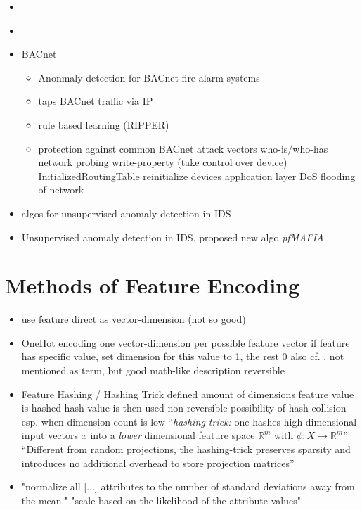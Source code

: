\begin{itemize}
	\item \parencite{Yang2006}
	\item \parencite{Celeda2012}
	\item \textcite{Pan2014} BACnet
		\begin{itemize}
			\item Anonmaly detection for BACnet fire alarm systems
			\item taps BACnet traffic via IP
			\item rule based learning (RIPPER)
			\item protection against common BACnet attack vectors
				\subitem who-is/who-has network probing
				\subitem write-property (take control over device)
				\subitem InitializedRoutingTable
				\subitem reinitialize devices
				\subitem application layer DoS
				\subitem flooding of network
		\end{itemize}
	
	\item \textcite{Eskin2002} algos for unsupervised anomaly detection in IDS
	\item \textcite{Leung2005} Unsupervised anomaly detection in IDS, proposed new algo \emph{pfMAFIA}
\end{itemize}

\section{Methods of Feature Encoding}
\label{sec:background:network:features}

\begin{itemize}
	\item use feature direct as vector-dimension (not so good)
	\item OneHot encoding
		\subitem one vector-dimension per possible feature vector
		\subitem if feature has specific value, set dimension for this value to 1, the rest 0
		\subitem also cf. \textcite[][p. 12]{Eskin2002}, not mentioned as term, but good math-like description
		\subitem reversible
	\item Feature Hashing / Hashing Trick
		\subitem defined amount of dimensions
		\subitem feature value is hashed
		\subitem hash value is then used
		\subitem non reversible
		\subitem possibility of hash collision
		\subitem esp. when dimension count is low
		\subitem \enquote{\emph{hashing-trick:} one hashes high dimensional input vectors $x$ into a \emph{lower} dimensional feature space $\mathbb{R}^m$ with $\phi: X \rightarrow \mathbb{R}^m$} \parencite{Weinberger2009,Shi2009,Langford2007}
		\subitem \enquote{Different from random projections, the hashing-trick preserves sparsity and introduces no additional overhead to store projection matrices} \parencite{Weinberger2009}
	\item "normalize all [...] attributes to the number of standard deviations away from the mean." \parencite{Eskin2002}
		\subitem "scale based on the likelihood of the attribute values" \parencite{Eskin2002}
		
\end{itemize}
